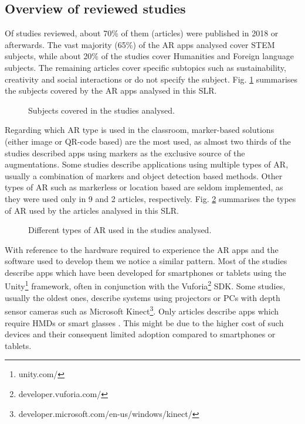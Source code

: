 \subsection{Overview of reviewed studies}

Of \papersSelected studies reviewed, about 70\% of them (\papersAfterTwentyEighteen articles) were published in 2018 or afterwards. The vast majority (65\%) of the AR apps analysed cover STEM subjects, while about 20\% of the studies cover Humanities and Foreign language subjects. The remaining articles cover specific subtopics such as sustainability, creativity and social interactions or do not specify the subject. Fig. \ref{fig:subjects} summarises the subjects covered by the AR apps analysed in this \gls{SLR}.

\begin{figure}[ht]	
	\begin{center}
	
	\caption{Subjects covered in the studies analysed.}
	\label{fig:subjects}
    \end{center}
\end{figure}

Regarding which AR type is used in the classroom, marker-based solutions (either image or QR-code based) are the most used, as almost two thirds of the studies described apps using markers as the exclusive source of the augmentations. 
Some studies describe applications using multiple types of \gls{AR}, usually a combination of markers and object detection based methods. Other types of \gls{AR} such as markerless or location based are seldom implemented, as they were used only in 9 and 2 articles, respectively. Fig. \ref{fig:artech} summarises the types of AR used by the articles analysed in this \gls{SLR}.

\begin{figure}[ht]	
	\begin{center}
	
	\caption{Different types of AR used in the studies analysed.}
	\label{fig:artech}
    \end{center}
\end{figure}

With reference to the hardware required to experience the AR apps and the software used to develop them we notice a similar pattern. Most of the studies describe apps which have been developed for smartphones or tablets using the Unity\footnote{unity.com/} framework, often in conjunction with the Vuforia\footnote{developer.vuforia.com/} \gls{SDK}. Some studies, usually the oldest ones, describe systems using projectors or PCs with depth sensor cameras such as Microsoft Kinect\footnote{developer.microsoft.com/en-us/windows/kinect/}. Only \hardwareHMD articles describe apps which require \glspl{HMD} or smart glasses \citep{wei2018improving, oh2016designing, oh2017hybrid, kum2019ar, khan2018mathland, matsutomo2017computer}. This might be due to the higher cost of such devices and their consequent limited adoption compared to smartphones or tablets.

